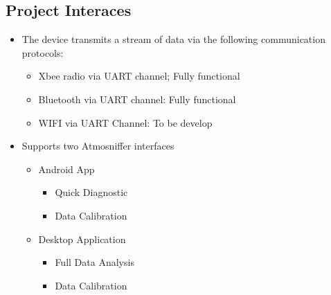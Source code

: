 \newpage \subsection{Project Interaces}
\begin{itemize}
\item The device transmits a stream of data via the following communication protocols:
	\begin{itemize}
	\item Xbee radio via UART channel; Fully functional
	\item Bluetooth via UART channel: Fully functional
	\item WIFI via UART Channel: To be develop
	\end{itemize}
\item Supports two Atmosniffer interfaces
	\begin{itemize}
	\item Android App
		\begin{itemize}
		\item Quick Diagnostic
		\item Data Calibration
		\end{itemize}
	\item Desktop Application
		\begin{itemize}
		\item Full Data Analysis
		\item Data Calibration
		\end{itemize}
	\end{itemize}
\end{itemize}

